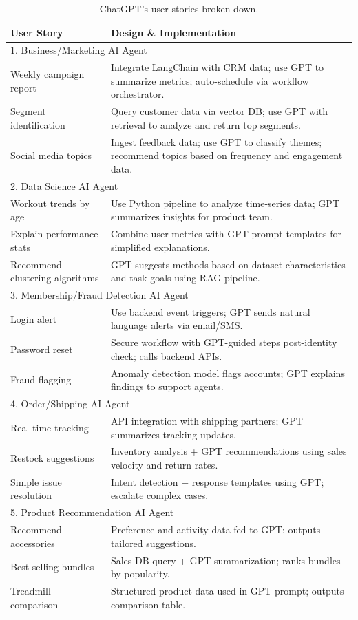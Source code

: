 \documentclass[11pt,letterpaper]{article}
\begin{document}
\begin{table}[h!]
    \centering
    \begin{tabular}{l p{.5\linewidth}}
User Story             & Design \& Implementation \\ \hline
\multicolumn{2}{l}{1. Business/Marketing AI Agent} \\
\hline
Weekly campaign report & Integrate LangChain with CRM data; use GPT to summarize metrics; auto-schedule via workflow orchestrator.  \\
Segment identification & Query customer data via vector DB; use GPT with retrieval to analyze and return top segments.              \\
Social media topics    & Ingest feedback data; use GPT to classify themes; recommend topics based on frequency and engagement data. \\
\hline        
\multicolumn{2}{l}{2. Data Science AI Agent} \\
\hline
Workout trends by age           & Use Python pipeline to analyze time-series data; GPT summarizes insights for product team. \\
Explain performance stats       & Combine user metrics with GPT prompt templates for simplified explanations.                \\
Recommend clustering algorithms & GPT suggests methods based on dataset characteristics and task goals using RAG pipeline.   \\
\hline
\multicolumn{2}{l}{3. Membership/Fraud Detection AI Agent} \\
\hline
Login alert    & Use backend event triggers; GPT sends natural language alerts via email/SMS.     \\
Password reset & Secure workflow with GPT-guided steps post-identity check; calls backend APIs.   \\
Fraud flagging & Anomaly detection model flags accounts; GPT explains findings to support agents. \\
\hline
\multicolumn{2}{l}{4. Order/Shipping AI Agent} \\
\hline
Real-time tracking      & API integration with shipping partners; GPT summarizes tracking updates. \\
Restock suggestions     & Inventory analysis + GPT recommendations using sales velocity and return rates. \\
Simple issue resolution & Intent detection + response templates using GPT; escalate complex cases. \\
\hline
\multicolumn{2}{l}{5. Product Recommendation AI Agent} \\
\hline
Recommend accessories & Preference and activity data fed to GPT; outputs tailored suggestions. \\
Best-selling bundles  & Sales DB query + GPT summarization; ranks bundles by popularity.       \\
Treadmill comparison  & Structured product data used in GPT prompt; outputs comparison table.  \\
    \end{tabular}
    \caption{ChatGPT's user-stories broken down.}
    \label{table:stories}
  \end{table}
\end{document}
